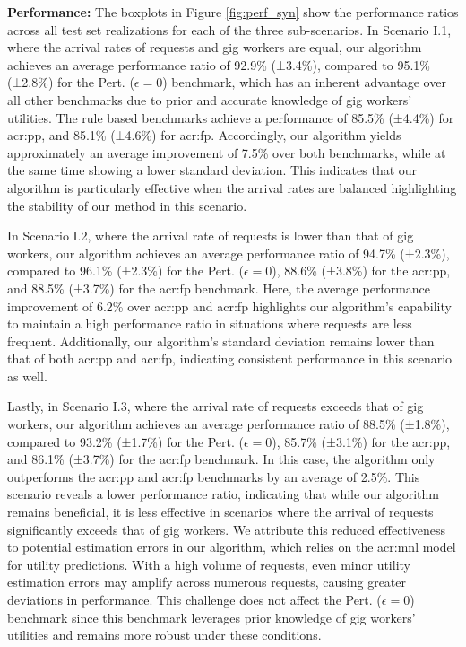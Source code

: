 \noindent \textbf{Performance:} The boxplots in Figure \ref{fig:perf_syn} show the performance ratios across all test set realizations for each of the three sub-scenarios. In Scenario I.1, where the arrival rates of requests and gig workers are equal, our algorithm achieves an average performance ratio of 92.9\% (±3.4\%), compared to 95.1\% (±2.8\%) for the Pert. ($\epsilon=0$) benchmark, which has an inherent advantage over all other benchmarks due to prior and accurate knowledge of gig workers' utilities. The rule based benchmarks achieve a performance of 85.5\% (±4.4\%) for \gls{acr:pp}, and 85.1\% (±4.6\%) for \gls{acr:fp}. Accordingly, our algorithm yields approximately an average improvement of 7.5\% over both benchmarks, while at the same time showing a lower standard deviation. This indicates that our algorithm is particularly effective when the arrival rates are balanced highlighting the stability of our method in this scenario.

In Scenario I.2, where the arrival rate of requests is lower than that of gig workers, our algorithm achieves an average performance ratio of 94.7\% (±2.3\%), compared to 96.1\% (±2.3\%) for the Pert. ($\epsilon=0$), 88.6\% (±3.8\%) for the \gls{acr:pp}, and 88.5\% (±3.7\%) for the \gls{acr:fp} benchmark. Here, the average performance improvement of 6.2\% over \gls{acr:pp} and \gls{acr:fp} highlights our algorithm's capability to maintain a high performance ratio in situations where requests are less frequent. Additionally, our algorithm's standard deviation remains lower than that of both \gls{acr:pp} and \gls{acr:fp}, indicating consistent performance in this scenario as well.

Lastly, in Scenario I.3, where the arrival rate of requests exceeds that of gig workers, our algorithm achieves an average performance ratio of 88.5\% (±1.8\%), compared to 93.2\% (±1.7\%) for the Pert. ($\epsilon=0$), 85.7\% (±3.1\%) for the \gls{acr:pp}, and 86.1\% (±3.7\%) for the \gls{acr:fp} benchmark. In this case, the algorithm only outperforms the \gls{acr:pp} and \gls{acr:fp} benchmarks by an average of 2.5\%. This scenario reveals a lower performance ratio, indicating that while our algorithm remains beneficial, it is less effective in scenarios where the arrival of requests significantly exceeds that of gig workers. We attribute this reduced effectiveness to potential estimation errors in our algorithm, which relies on the \gls{acr:mnl} model for utility predictions. With a high volume of requests, even minor utility estimation errors may amplify across numerous requests, causing greater deviations in performance. This challenge does not affect the Pert. ($\epsilon=0$) benchmark since this benchmark leverages prior knowledge of gig workers’ utilities and remains more robust under these conditions.

